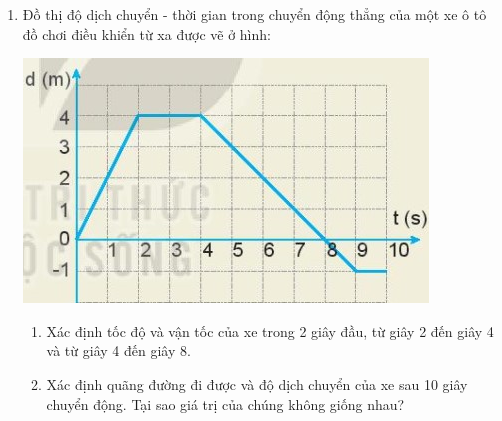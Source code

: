 \begin{enumerate}[label=\bfseries Câu \arabic*:]
{\begin{enumerate}[label=\alph*)]
		\end{enumerate}
	}
		\item {}
	
	{
		Đồ thị độ dịch chuyển - thời gian trong chuyển động thẳng của một xe ô tô đồ chơi điều khiển từ xa được vẽ ở hình: 
		\begin{center}
			\includegraphics[scale=1]{../figs/VN10-2022-PH-TP006-4.jpg}
		\end{center}
		
		
		\begin{enumerate}[label=\alph*)]
			\item Xác định tốc độ và vận tốc của xe trong 2 giây đầu, từ giây 2 đến giây 4 và từ giây 4 đến giây 8.
			\item Xác định quãng đường đi được và độ dịch chuyển của xe sau 10 giây chuyển động. Tại sao giá trị của chúng không giống nhau?
		\end{enumerate}
	}
\end{enumerate}

